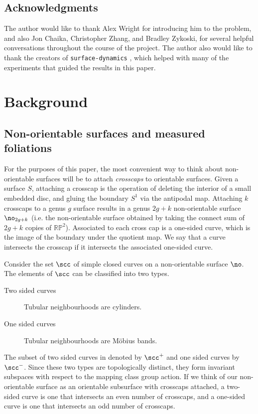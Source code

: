 \documentclass[12pt, reqno]{amsart}
\begin{document}
\subsection*{Acknowledgments}
The author would like to thank Alex Wright for introducing him to the problem, and also Jon Chaika, Christopher Zhang, and Bradley Zykoski, for several helpful conversations throughout the course of the project.
The author also would like to thank the creators of \texttt{surface-dynamics} \cite{vincent_delecroix_2021_5057590}, which helped with many of the experiments that guided the results in this paper.

\section{Background}
\label{sec:background}

\subsection{Non-orientable surfaces and measured foliations}
\label{sec:backgr-meas-foli}

For the purposes of this paper, the most convenient way to think about non-orientable surfaces will be to attach \emph{crosscaps} to orientable surfaces.
Given a surface $S$, attaching a crosscap is the operation of deleting the interior of a small embedded disc, and gluing the boundary $S^1$ via the antipodal map.
Attaching $k$ crosscaps to a genus $g$ surface results in a genus $2g+k$ non-orientable surface $\no_{2g+k}$ (i.e. the non-orientable surface obtained by taking the connect sum of $2g+k$ copies of $\mathbb{RP}^2$).
Associated to each cross cap is a one-sided curve, which is the image of the boundary under the quotient map.
We say that a curve intersects the crosscap if it intersects the associated one-sided curve.

Consider the set $\scc$ of simple closed curves on a non-orientable surface $\no$.
The elements of $\scc$ can be classified into two types.
\begin{description}
\item[Two sided curves] Tubular neighbourhoods are cylinders.
\item[One sided curves] Tubular neighbourhoods are Möbius bands.
\end{description}
The subset of two sided curves in denoted by $\scc^+$ and one sided curves by $\scc^-$.
Since these two types are topologically distinct, they form invariant subspaces with respect to the mapping class group action.
If we think of our non-orientable surface as an orientable subsurface with crosscaps attached, a two-sided curve is one that intersects an even number of crosscaps, and a one-sided curve is one that intersects an odd number of crosscaps.
\end{document}
